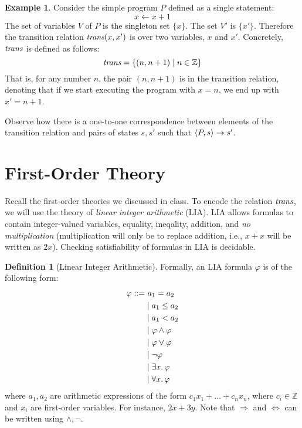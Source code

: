 \documentclass{amsart}
\theoremstyle{definition}
\newtheorem{definition}[theorem]{Definition}
\newtheorem{example}[theorem]{Example}
\theoremstyle{remark}
\numberwithin{equation}{section}
\begin{document}
\begin{example}
  Consider the simple program $P$ defined as a single
  statement:
  $$x \gets x + 1$$
  The set of variables $V$ of $P$ is the singleton set $\{x\}$.
  The set $V'$ is $\{x'\}$.
  Therefore the transition relation $\emph{trans}(x,x')$
  is over two variables, $x$ and $x'$.
  Concretely, $\emph{trans}$ is defined as follows:
  $$\emph{trans} = \{(n,n+1) \mid n \in \mathbb{Z}\}$$
  That is, for any number $n$, the pair $(n,n+1)$
  is in the transition relation,
  denoting that if we start executing the program
  with $x = n$, we end up with $x' = n+1$.

  Observe how there is a one-to-one
  correspondence between elements of the transition
  relation and pairs of states $s,s'$ such that
  $\langle P,s \rangle \to s'$.
\end{example}

\section{First-Order Theory}
Recall the first-order theories we discussed in class.
To encode the relation $\emph{trans}$, we will use
the theory of \emph{linear integer arithmetic} (LIA).
LIA allows formulas to contain
integer-valued variables, equality, ineqality, addition, and
\emph{no multiplication} (multiplication will only be to replace addition, i.e., $x + x$ will be written as $2x$).
Checking satisfiability of formulas in LIA
is decidable.

\begin{definition}[Linear Integer Arithmetic]
Formally, an LIA formula $\varphi$  is of the following form:
\begin{align*}
  \varphi ::= &~ a_1 = a_2\\
    & \mid  a_1 \leq a_2 \\
    & \mid a_1 < a_2 \\
    & \mid \varphi \land \varphi \\
    & \mid \varphi \lor \varphi \\
    & \mid \neg \varphi\\
    & \mid \exists x \ldotp \varphi\\
    & \mid \forall x \ldotp \varphi
\end{align*}
where $a_1,a_2$ are arithmetic expressions of the form
$c_1x_1 + \ldots + c_nx_n$, where $c_i \in \mathbb{Z}$
and $x_i$ are first-order variables. For instance, $2x + 3y$.
Note that $\Rightarrow$ and $\iff$ can be written using $\land,\neg$.
\end{definition}
\end{document}
